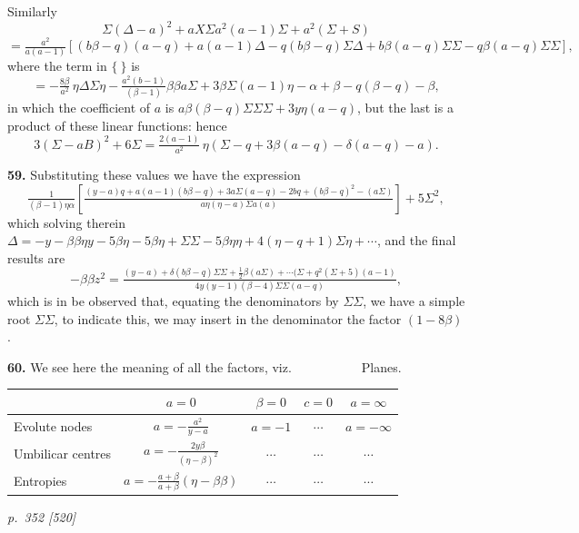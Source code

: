 \documentclass[11pt,a4paper]{book}
\begin{document}
Similarly
\[
\Sigma(\Delta - a)^2 + aX\Sigma a^2(a - 1)\Sigma + a^2(\Sigma + S)
\]
\[
= \tfrac{a^2}{a(a - 1)}\!\left[(b\beta - q)(a - q) + a(a - 1)\Delta - q(b\beta - q)\Sigma\Delta + b\beta(a - q)\Sigma\Sigma - q\beta(a - q)\Sigma\Sigma\right],
\]
where the term in $\{\ \}$ is
\[
= -\tfrac{8\beta}{a^2}\,\eta\Delta\Sigma\eta - \tfrac{a^2(b - 1)}{(\beta - 1)}\beta\beta a\Sigma + 3\beta\Sigma(a - 1)\eta - \alpha + \beta - q(\beta - q) - \beta,
\]
in which the coefficient of $a$ is $a\beta(\beta - q)\Sigma\Sigma\Sigma + 3y\eta(a - q)$, but the last is a product of these linear functions: hence
\[
3(\Sigma - aB)^2 + 6\Sigma = \tfrac{2(a - 1)}{a^2}\,\eta(\Sigma - q + 3\beta(a - q) - \delta(a - q) - a).
\]

\textbf{59.} Substituting these values we have the expression
\[
\tfrac{1}{(\beta - 1)\eta\alpha}\!\left[\tfrac{(y - a)q + a(a - 1)(b\beta - q) + 3a\Sigma(a - q) - 2bq + (b\beta - q)^2 - (a\Sigma)}{a\eta(\eta - a)\Sigma a(a)}\right] + 5\Sigma^2,
\]
which solving therein $\Delta = -y - \beta\beta\eta y - 5\beta\eta - 5\beta\eta + \Sigma\Sigma - 5\beta\eta\eta + 4(\eta - q + 1)\Sigma\eta + \cdots$, and the final results are
\[
-\beta\beta z^2 = \tfrac{(y - a)+ \delta(b\beta - q)\Sigma\Sigma + \tfrac{1}{2}\beta(a\Sigma) + \cdots(\Sigma + q^2(\Sigma + 5)(a - 1)}{4y(y - 1)(\beta - 4)\Sigma\Sigma(a - q)},
\]
which is in be observed that, equating the denominators by $\Sigma\Sigma$, we have a simple root $\Sigma\Sigma$, to indicate this, we may insert in the denominator the factor $(1 - 8\beta)$.

\textbf{60.} We see here the meaning of all the factors, viz.\ \ \ \ \ \ \ \ \ \ \ Planes.
\begin{center}
\begin{tabular}{l|cccc}
 & $a = 0$ & $\beta = 0$ & $c = 0$ & $a = \infty$\\
\hline
Evolute nodes & $a = -\tfrac{a^2}{y - a}$ & $a = -1$ & $\cdots$ & $a = -\infty$\\
Umbilicar centres & $a = -\tfrac{2y\beta}{(\eta - \beta)^2}$ & $\cdots$ & $\cdots$ & $\cdots$\\
Entropies & $a = -\tfrac{a + \beta}{a + \beta}(\eta - \beta\beta)$ & $\cdots$ & $\cdots$ & $\cdots$\\
\end{tabular}
\end{center}

\clearpage

\bigskip
\textit{p.~352 [520]}
\smallskip
\end{document}
